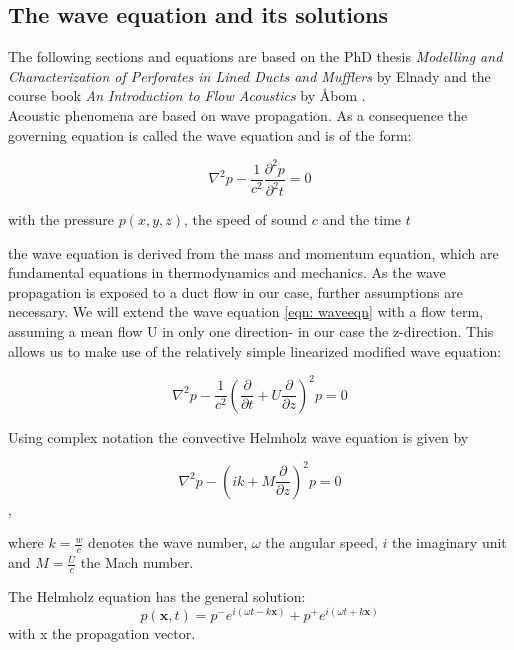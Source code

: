\documentclass[11pt]{report} %
\begin{document}
\subsection{The wave equation and its solutions}
The following sections and equations are based on the PhD thesis \textit{Modelling and Characterization of Perforates in Lined Ducts and Mufflers} by Elnady \cite{Elnady2004} and the course book \textit{An Introduction to Flow Acoustics} by Åbom \cite{Abom2010}.\\ 
Acoustic phenomena are based on wave propagation. As a consequence the governing equation is called the wave equation and is of the form: 

\begin{equation}
    \nabla^2p-\frac{1}{c^2}\frac{\partial^2p}{\partial^2t}  = 0 \label{eqn: waveeqn}
 \end{equation} 
 
with the pressure $p(x,y,z)$, the speed of sound $c$ and the time $t$

the wave equation is derived from the mass and momentum equation, which are fundamental equations in thermodynamics and mechanics. 
As the wave propagation is exposed to a duct flow in our case, further assumptions are necessary.
We will extend the wave equation \eqref{eqn: waveeqn} with a flow term, assuming a mean flow U in only one direction- in our case the z-direction.
This allows us to make use of the relatively simple linearized modified wave equation: 

\begin{equation}
    \nabla ^2p-\frac{1}{c^2} \left( \frac{\partial}{\partial t}+U\frac{\partial}{\partial z} \right)^2p  = 0
\end{equation}   

Using complex notation the convective Helmholz wave equation is given by 

\begin{equation}
\nabla^2 p - \left(ik +M\frac{\partial}{\partial z}\right)^2p = 0
\end{equation},  

where $k=\frac{w}{c}$ denotes the wave number, $\omega$ the angular speed, $i$ the imaginary unit and $M=\frac{U}{c}$ the Mach number. 

The Helmholz equation has the general solution:
\begin{equation}
p(\textbf{x},t)=p^{-}e^{i(\omega t-k\textbf{x})}+p^{+}e^{i(\omega t+k\textbf{x})}
\end{equation}
with x the propagation vector. 
\end{document}
